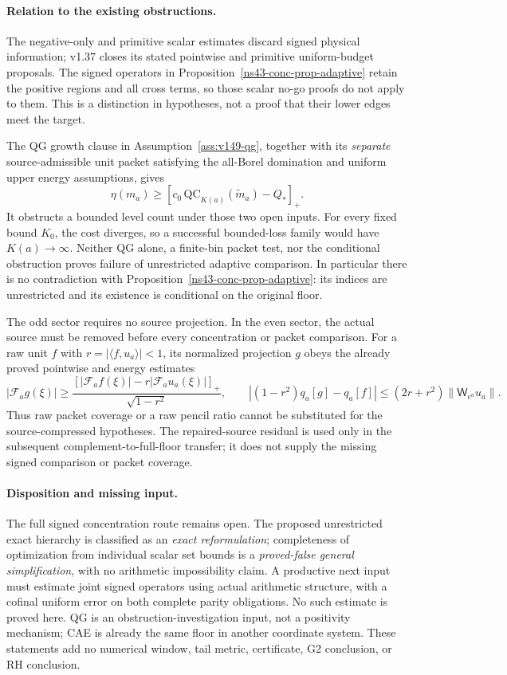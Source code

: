\paragraph{Relation to the existing obstructions.}
The negative-only and primitive scalar estimates discard signed
physical information; v1.37 closes its stated pointwise and primitive
uniform-budget proposals. The signed operators in
Proposition~\ref{ns43-conc-prop-adaptive} retain the positive regions
and all cross terms, so those scalar no-go proofs do not apply to them.
This is a distinction in hypotheses, not a proof that their lower
edges meet the target.

The QG growth clause in Assumption~\ref{ass:v149-qg}, together with
its \emph{separate} source-admissible unit packet satisfying the
all-Borel domination and uniform upper energy assumptions, gives
\[
 \eta(m_a)\ge
 [c_0\,\mathrm{QC}_{K(a)}(\widetilde m_a)-Q_*]_+.
\]
It obstructs a bounded level count under those two open inputs.
For every fixed bound $K_0$, the cost diverges, so a successful
bounded-loss family would have $K(a)\to\infty$.
Neither QG alone, a finite-bin packet test, nor the conditional
obstruction proves failure of unrestricted adaptive comparison.
In particular there is no contradiction with
Proposition~\ref{ns43-conc-prop-adaptive}: its indices are unrestricted
and its existence is conditional on the original floor.

The odd sector requires no source projection. In the even sector,
the actual source must be removed before every concentration or
packet comparison. For a raw unit $f$ with
$r=|\langle f,u_a\rangle|<1$, its normalized projection $g$ obeys
the already proved pointwise and energy estimates
\[
 |\mathcal F_ag(\xi)|\ge
 \frac{[|\mathcal F_af(\xi)|-r|\mathcal F_au_a(\xi)|]_+}
 {\sqrt{1-r^2}},\qquad
 |(1-r^2)q_a[g]-q_a[f]|
 \le(2r+r^2)\|\mathsf W_{e^a}u_a\|.
\]
Thus raw packet coverage or a raw pencil ratio cannot be substituted
for the source-compressed hypotheses. The repaired-source residual
is used only in the subsequent complement-to-full-floor transfer;
it does not supply the missing signed comparison or packet coverage.

\paragraph{Disposition and missing input.}
The full signed concentration route remains open. The proposed
unrestricted exact hierarchy is classified as an \emph{exact
reformulation}; completeness of optimization from individual scalar
set bounds is a \emph{proved-false general simplification}, with no
arithmetic impossibility claim. A productive next input must estimate
joint signed operators using actual arithmetic structure, with a
cofinal uniform error on both complete parity obligations. No such
estimate is proved here. QG is an obstruction-investigation input,
not a positivity mechanism; CAE is already the same floor in another
coordinate system. These statements add no numerical window, tail
metric, certificate, G2 conclusion, or RH conclusion.
